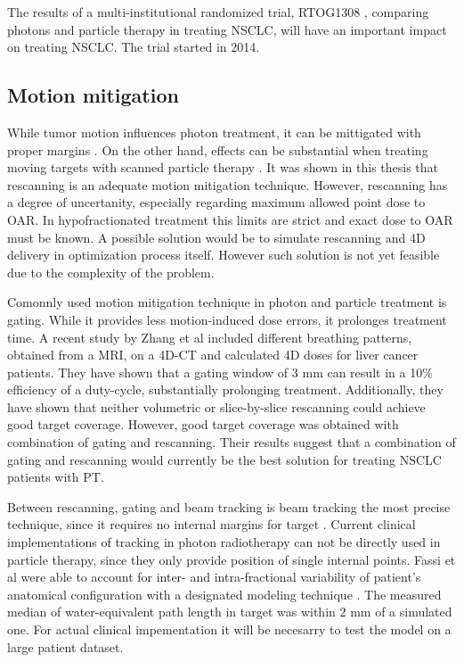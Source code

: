 The results of a multi-institutional randomized trial, RTOG1308 \cite{RTOG1308}, comparing photons and particle therapy in treating NSCLC,
will have an important impact on treating NSCLC. The trial started in 2014.

\subsection{Motion mitigation}

While tumor motion influences photon treatment, it can be mittigated with proper margins \cite{Zou2014}. 
On the other hand, effects can be substantial when treating moving targets with scanned particle therapy \cite{Bert2008}.
It was shown in this thesis that rescanning is an adequate motion mitigation technique. However, rescanning has a degree of uncertanity, 
especially regarding maximum allowed point dose to OAR.
In hypofractionated treatment this limits are strict and exact dose to OAR must be known. 
A possible solution would be to simulate rescanning and 4D delivery in optimization process itself. 
However such solution is not yet feasible due to the complexity of the problem.

Comonnly used motion mitigation technique in photon and particle treatment is gating. While it provides less motion-induced dose errors, it prolonges treatment time.
A recent study by Zhang et al \cite{Zhang2015} included 
different breathing patterns, obtained from a MRI, on a 4D-CT and calculated 4D doses for liver cancer patients. They have shown that a gating window of 3 mm can result
in a 10\% efficiency of a duty-cycle, 
substantially prolonging treatment. Additionally, they have shown that neither volumetric or slice-by-slice rescanning could achieve good target coverage.
However, good target coverage was obtained with combination
of gating and rescanning. Their results suggest that a combination of gating and rescanning would currently be the best solution for treating NSCLC patients with PT.

Between rescanning, gating and beam tracking is beam tracking the most precise technique, since it requires no internal margins for target \cite{Bert2011}. 
Current clinical implementations of tracking in photon radiotherapy \cite{Kilby2010, Keall2014} can not be directly used in particle therapy, 
since they only provide position of single internal points. Fassi et al 
\cite{Fassi2015} were able to account for inter- and intra-fractional variability of patient's anatomical configuration with a designated modeling technique \cite{Fassi2014}.
The measured median of water-equivalent path length in target was within 2 mm of a simulated one. For actual clinical impementation it will be necesarry to test the model
on a large patient dataset.


